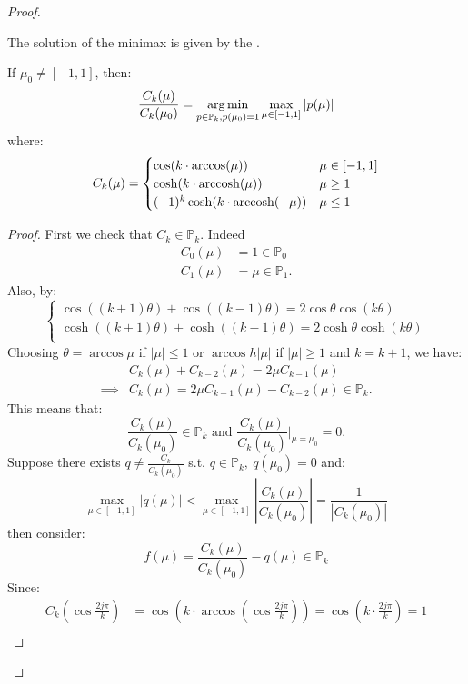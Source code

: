\documentclass[../main/main.tex]{subfiles}
\begin{document}
\begin{proof}
\begin{enumerate}
        The solution of the minimax is given by the .
\end{enumerate}
\begin{lemma}
  If $\mu _{0}\neq [-1,1]$, then: \[
    \frac{C_{k}(\mu)}{C_{k}(\mu_{0})} = \operatorname*{arg\,min}_{p\in \mathbb{P}_{k}, p(\mu_{0})=1}\max_{\mu  \in [-1,1]} |p(\mu)|
  \] where: \[
C_{k}(\mu) = \begin{cases}
 \cos (k\cdot \arccos(\mu)) & \mu  \in [-1,1]\\
 \cosh (k\cdot \operatorname*{arccosh}(\mu)) & \mu \geq 1\\
(-1)^{k} \cosh (k\cdot \operatorname*{arccosh}(-\mu)) & \mu \leq  1
\end{cases}
  \]
\end{lemma}
\begin{proof}
  First we check that $C_{k} \in  \mathbb{P}_{k}$. Indeed \begin{align*}
                                                            C_{0}(\mu)&=1\in \mathbb{P}_{0}\\
                                                            C_{1}(\mu) &= \mu \in \mathbb{P}_{1}
                                                            .\end{align*} Also, by: \[
\begin{cases}
  \cos ((k+1)\theta ) + \cos ((k-1)\theta) = 2\cos \theta  \cos (k\theta)\\
  \cosh ((k+1)\theta ) + \cosh ((k-1)\theta) = 2\cosh \theta  \cosh (k\theta)\\
\end{cases} \] Choosing $\theta  = \arccos  \mu $ if $|\mu |\leq 1$ or $\arccos h |\mu |$ if $|\mu |\geq 1$ and $k = k+1$, we have:
\begin{align*}
  &C_{k}(\mu)+C_{k-2}(\mu) = 2 \mu C_{k-1}(\mu)\\
  \implies & C_{k}(\mu) = 2\mu C_{k-1}(\mu)-C_{k-2}(\mu) \in \mathbb{P}_{k}
  .\end{align*}
This means that: \[
  \frac{C_{k}(\mu)}{C_{k}(\mu_{0})}\in\mathbb{P}_{k} \text{ and } \frac{C_{k}(\mu)}{C_{k}(\mu_{0})}\bigg\rvert_{\mu = \mu_{0}} = 0.
\]
Suppose there exists $q\neq \frac{C_{k}}{C_{k}(\mu_{0})} $ s.t. $q \in\mathbb{P}_{k},\ q(\mu_{0})=0$ and: \[
\max_{\mu\in[-1,1]}|q(\mu)| < \max_{\mu\in [-1,1]}\left| \frac{C_{k}(\mu)}{C_{k}(\mu_{0})}\right| = \frac{1}{|C_{k}(\mu_{0})|}
\] then consider: \[
f(\mu) = \frac{C_{k}(\mu)}{C_{k}(\mu_{0})}- q(\mu) \in\mathbb{P}_{k}
\] Since:
\begin{align*}
  C_{k}\left(\cos \frac{2j\pi}{k} \right) &= \cos\left(k \cdot \arccos \left(\cos \frac{2j\pi}{k} \right)\right) = \cos \left(k \cdot \frac{2j\pi}{k} \right) = 1\\

\end{align*}
\end{proof}
\end{proof}
\end{document}
